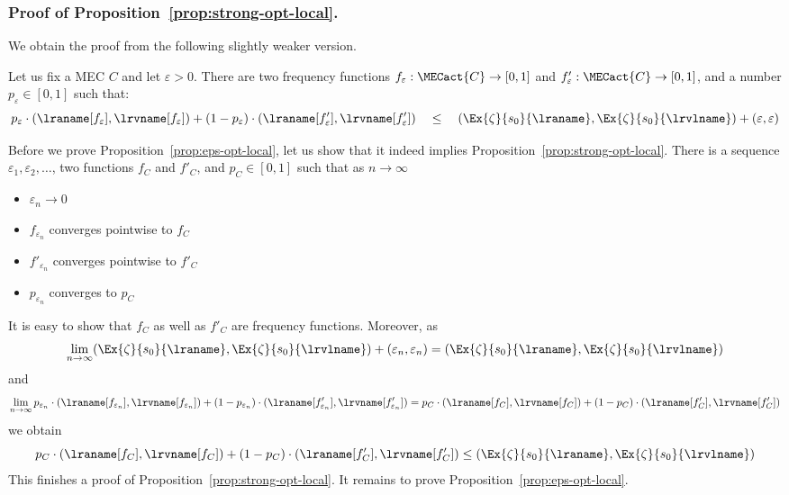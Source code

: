 \subsubsection{Proof of Proposition~\ref{prop:strong-opt-local}.}\label{app-strong-opt}
We obtain the proof from the following slightly weaker version.
\begin{proposition}\label{prop:eps-opt-local}
Let us fix a MEC $C$ and let $\varepsilon>0$. There are two frequency functions $f_{\varepsilon}:\MECact{C}\rightarrow [0,1]$ and $f'_{\varepsilon}:\MECact{C}\rightarrow [0,1]$, and a number $p_{\varepsilon}\in [0,1]$ such that:
\[
p_{\varepsilon}\cdot (\lraname[f_{\varepsilon}],\lrvname[f_\varepsilon])+(1-p_{\varepsilon})\cdot
 (\lraname[f'_{\varepsilon}],\lrvname[f'_\varepsilon])\quad \leq \quad
(\Ex{\zeta}{s_0}{\lraname}, \Ex{\zeta}{s_0}{\lrvlname})+(\varepsilon,\varepsilon)
\]
\end{proposition}
\noindent
Before we prove Proposition~\ref{prop:eps-opt-local}, let us show that it indeed implies Proposition~\ref{prop:strong-opt-local}.
There is a sequence $\varepsilon_1,\varepsilon_2,\ldots$, two functions $f_C$ and $f'_C$, and $p_C\in [0,1]$ such that as $n\rightarrow \infty$ 
\begin{itemize}
\item $\varepsilon_n\rightarrow 0$ 
\item $f_{\varepsilon_n}$ converges pointwise to $f_C$
\item $f'_{\varepsilon_n}$ converges pointwise to $f'_C$
\item $p_{\varepsilon_n}$ converges to $p_C$
\end{itemize}
It is easy to show that $f_C$ as well as $f'_C$ are frequency functions. Moreover, 
as 
\[
\lim_{n\rightarrow \infty} (\Ex{\zeta}{s_0}{\lraname}, \Ex{\zeta}{s_0}{\lrvlname})+(\varepsilon_n,\varepsilon_n)=
(\Ex{\zeta}{s_0}{\lraname}, \Ex{\zeta}{s_0}{\lrvlname})
\]
and
\[
\lim_{n\rightarrow \infty}  p_{\varepsilon_n}\cdot (\lraname[f_{\varepsilon_n}],\lrvname[f_{\varepsilon_n}])+(1-p_{\varepsilon_n})\cdot
 (\lraname[f'_{\varepsilon_n}],\lrvname[f'_{\varepsilon_n}])
  =  p_C\cdot (\lraname[f_C],\lrvname[f_C])+(1-p_C)\cdot
 (\lraname[f'_C],\lrvname[f'_C])
\]
we obtain
\[
p_C\cdot (\lraname[f_C],\lrvname[f_C])+(1-p_C)\cdot
 (\lraname[f'_C],\lrvname[f'_C])\le (\Ex{\zeta}{s_0}{\lraname}, \Ex{\zeta}{s_0}{\lrvlname})
\]
This finishes a proof of Proposition~\ref{prop:strong-opt-local}. It remains to prove Proposition~\ref{prop:eps-opt-local}.

